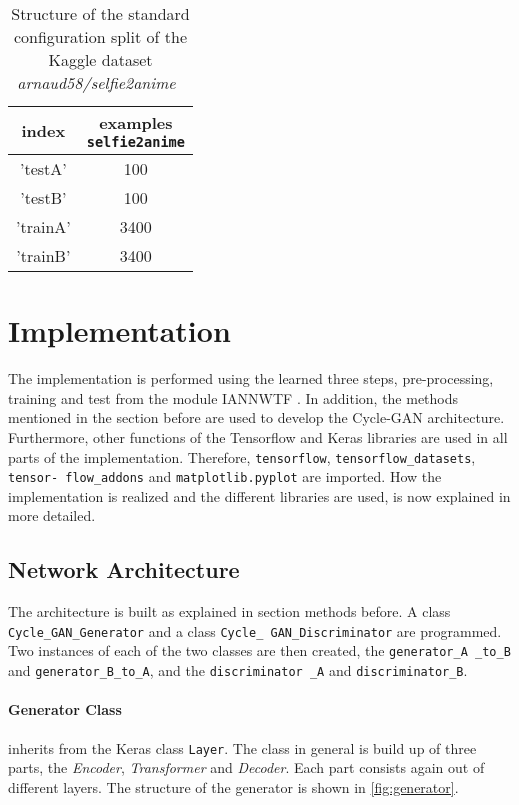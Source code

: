 \documentclass[fleqn,10pt]{SelfArx} %
\begin{document}
\begin{table}[htb]
\centering
\caption{Structure of the standard configuration split of the Kaggle dataset \textit{arnaud58/selfie2anime}~\cite{kaggle-dataset}}
\label{tab:datasetKaggle}
\begin{tabular}{c c}
\textbf{index} & \makecell{\textbf{examples} \\ \textbf{\texttt{selfie2anime}}} \\ \hline
'testA' & 100 \\ \hline
'testB' & 100 \\ \hline
'trainA' & 3400 \\ \hline
'trainB' & 3400 \\ \hline
\end{tabular}
\end{table}
\section{Implementation}
The implementation is performed using the learned three steps, pre-processing, training and test from the module \ac{IANNWTF} \cite{implementingANsCourseware02, implementingANsCourseware03}. In addition, the methods mentioned in the section before are used to develop the Cycle-\ac{GAN} architecture. Furthermore, other functions of the Tensorflow and Keras libraries are used in all parts of the implementation. Therefore, \texttt{tensorflow}, \texttt{tensorflow\_datasets}, \texttt{tensor- flow\_addons} and \texttt{matplotlib.pyplot} are imported. How the implementation is realized and the different libraries are used, is now explained in more detailed.

\subsection{Network Architecture}
The architecture is built as explained in section methods before. A class \texttt{Cycle\_GAN\_Generator} and a class \texttt{Cycle\_ GAN\_Discriminator} are programmed. Two instances of each of the two classes are then created, the \texttt{generator\_A \_to\_B} and \texttt{generator\_B\_to\_A}, and the \texttt{discriminator \_A} and \texttt{discriminator\_B}.

\paragraph{Generator Class} inherits from the Keras class \texttt{Layer}. The class in general is build up of three parts, the \textit{Encoder}, \textit{Transformer} and \textit{Decoder}. Each part consists again out of different layers. The structure of the generator is shown in \autoref{fig:generator}.~\cite{Introduction-to-Cycle-GANs}
\end{document}
